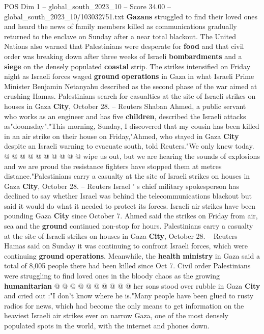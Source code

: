 \begin{textsample}{POS Dim 1 – global\_south\_2023\_10 – Score 34.00 – global\_south\_2023\_10/103032751.txt}  \label{ex:f1_pos_189}
\textbf{Gazans} struggled to find their loved ones and heard the news of family members killed as communications gradually returned to the enclave on Sunday after a near total blackout.
The United Nations also warned that Palestinians were desperate for \textbf{food} and that civil order was breaking down after three weeks of Israeli \textbf{bombardments} and a \textbf{siege} on the densely populated \textbf{coastal} strip.
The strikes intensified on Friday night as Israeli forces waged \textbf{ground} \textbf{operations} in Gaza in what Israeli Prime Minister Benjamin Netanyahu described as the second phase of the war aimed at crushing Hamas.
Palestinians search for casualties at the site of Israeli strikes on houses in Gaza \textbf{City}, October 28. -- Reuters Shaban Ahmed, a public servant who works as an engineer and has five \textbf{children}, described the Israeli attacks as"doomsday"."This morning, Sunday, I discovered that my cousin has been killed in an air strike on their house on Friday,"Ahmed, who stayed in Gaza \textbf{City} despite an Israeli warning to evacuate south, told Reuters."We only knew today. @ @ @ @ @ @ @ @ @ @ wipe us out, but we are hearing the sounds of explosions and we are proud the resistance fighters have stopped them at metres distance."Palestinians carry a casualty at the site of Israeli strikes on houses in Gaza \textbf{City}, October 28. -- Reuters Israel ' s chief military spokesperson has declined to say whether Israel was behind the telecommunications blackout but said it would do what it needed to protect its forces.
Israeli air strikes have been pounding Gaza \textbf{City} since October 7.
Ahmed said the strikes on Friday from air, sea and the \textbf{ground} continued non-stop for hours.
Palestinians carry a casualty at the site of Israeli strikes on houses in Gaza \textbf{City}, October 28. -- Reuters Hamas said on Sunday it was continuing to confront Israeli forces, which were continuing \textbf{ground} \textbf{operations}.
Meanwhile, the \textbf{health} \textbf{ministry} in Gaza said a total of 8,005 people there had been killed since Oct 7.
Civil order Palestinians were struggling to find loved ones in the bloody chaos as the growing \textbf{humanitarian} @ @ @ @ @ @ @ @ @ @ her sons stood over rubble in Gaza \textbf{City} and cried out :"I don't know where he is."Many people have been glued to rusty radios for news, which had become the only means to get information on the heaviest Israeli air strikes ever on narrow Gaza, one of the most densely populated spots in the world, with the internet and phones down.

\end{textsample}
